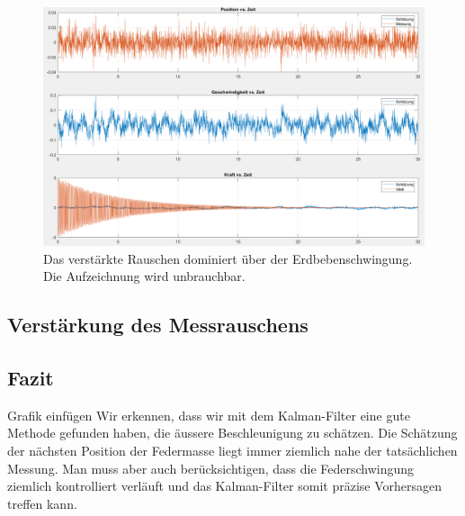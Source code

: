 \begin{figure}
	\begin{center}
		\includegraphics[width=15cm]{papers/erdbeben/Prozessrauschen_geaendert.PNG}
		\caption{Das verstärkte Rauschen dominiert über der Erdbebenschwingung. Die Aufzeichnung wird unbrauchbar.}
	\end{center}
\end{figure}

\subsection{Verstärkung des Messrauschens}




\subsection{Fazit}
Grafik einfügen
Wir erkennen, dass wir mit dem Kalman-Filter eine gute Methode gefunden haben, die äussere Beschleunigung zu schätzen. Die Schätzung der nächsten Position der Federmasse liegt immer ziemlich nahe der tatsächlichen Messung. Man muss aber auch berücksichtigen, dass die Federschwingung ziemlich kontrolliert verläuft und das Kalman-Filter somit präzise Vorhersagen treffen kann.
